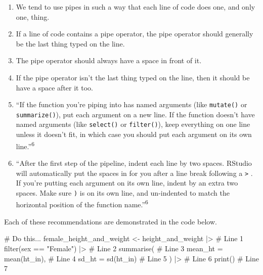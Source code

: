 \documentclass[
  letterpaper,
  DIV=11,
  numbers=noendperiod]{scrreprt}
\newenvironment{Shaded}{\begin{snugshade}}{\end{snugshade}}
\newcommand{\AttributeTok}[1]{\textcolor[rgb]{0.40,0.45,0.13}{#1}}
\newcommand{\CommentTok}[1]{\textcolor[rgb]{0.37,0.37,0.37}{#1}}
\newcommand{\FunctionTok}[1]{\textcolor[rgb]{0.28,0.35,0.67}{#1}}
\newcommand{\NormalTok}[1]{\textcolor[rgb]{0.00,0.23,0.31}{#1}}
\newcommand{\OtherTok}[1]{\textcolor[rgb]{0.00,0.23,0.31}{#1}}
\newcommand{\SpecialCharTok}[1]{\textcolor[rgb]{0.37,0.37,0.37}{#1}}
\newcommand{\StringTok}[1]{\textcolor[rgb]{0.13,0.47,0.30}{#1}}
\begin{document}
\begin{enumerate}
\def\labelenumi{\arabic{enumi}.}
\item
  We tend to use pipes in such a way that each line of code does one,
  and only one, thing.
\item
  If a line of code contains a pipe operator, the pipe operator should
  generally be the last thing typed on the line.
\item
  The pipe operator should always have a space in front of it.
\item
  If the pipe operator isn't the last thing typed on the line, then it
  should be have a space after it too.
\item
  ``If the function you're piping into has named arguments (like
  \texttt{mutate()} or \texttt{summarize()}), put each argument on a new
  line. If the function doesn't have named arguments (like
  \texttt{select()} or \texttt{filter()}), keep everything on one line
  unless it doesn't fit, in which case you should put each argument on
  its own line.''\textsuperscript{6}
\item
  ``After the first step of the pipeline, indent each line by two
  spaces. RStudio will automatically put the spaces in for you after a
  line break following a \texttt{\textbar{}\textgreater{}} . If you're
  putting each argument on its own line, indent by an extra two spaces.
  Make sure \texttt{)} is on its own line, and un-indented to match the
  horizontal position of the function name.''\textsuperscript{6}
\end{enumerate}

Each of these recommendations are demonstrated in the code below.

\begin{Shaded}
\begin{Highlighting}[]
\CommentTok{\# Do this...}
\NormalTok{female\_height\_and\_weight }\OtherTok{\textless{}{-}}\NormalTok{ height\_and\_weight }\SpecialCharTok{|\textgreater{}} \CommentTok{\# Line 1}
  \FunctionTok{filter}\NormalTok{(sex }\SpecialCharTok{==} \StringTok{"Female"}\NormalTok{) }\SpecialCharTok{|\textgreater{}}                     \CommentTok{\# Line 2}
  \FunctionTok{summarise}\NormalTok{(                                     }\CommentTok{\# Line 3}
    \AttributeTok{mean\_ht =} \FunctionTok{mean}\NormalTok{(ht\_in),                       }\CommentTok{\# Line 4}
    \AttributeTok{sd\_ht   =} \FunctionTok{sd}\NormalTok{(ht\_in)                          }\CommentTok{\# Line 5}
\NormalTok{  ) }\SpecialCharTok{|\textgreater{}}                                           \CommentTok{\# Line 6}
  \FunctionTok{print}\NormalTok{()                                        }\CommentTok{\# Line 7}
\end{Highlighting}
\end{Shaded}
\end{document}
